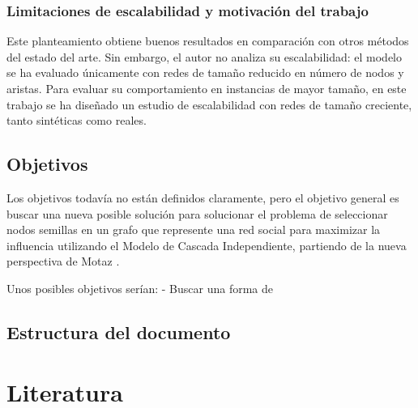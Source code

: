 \documentclass[12pt,twoside,titlepage]{report}
\begin{document}
\subsection{Limitaciones de escalabilidad y motivación del trabajo} \label{subsec:motivacion}

Este planteamiento obtiene buenos resultados en comparación con otros métodos del estado del arte. Sin embargo, el autor no analiza su escalabilidad: el modelo se ha evaluado únicamente con redes de tamaño reducido en número de nodos y aristas. Para evaluar su comportamiento en instancias de mayor tamaño, en este trabajo se ha diseñado un estudio de escalabilidad con redes de tamaño creciente, tanto sintéticas como reales.


\section{Objetivos} \label{sec:objetivos}

Los objetivos todavía no están definidos claramente, pero el objetivo general es buscar una nueva posible solución para solucionar el problema de seleccionar nodos semillas en un grafo que represente una red social para maximizar la influencia utilizando el Modelo de Cascada Independiente, partiendo de la nueva perspectiva de Motaz \cite{motaz}.

Unos posibles objetivos serían:
- Buscar una forma de 

\section{Estructura del documento} \label{sec:estructura}



\chapter{Literatura} \label{chap:lit} 
\end{document}
